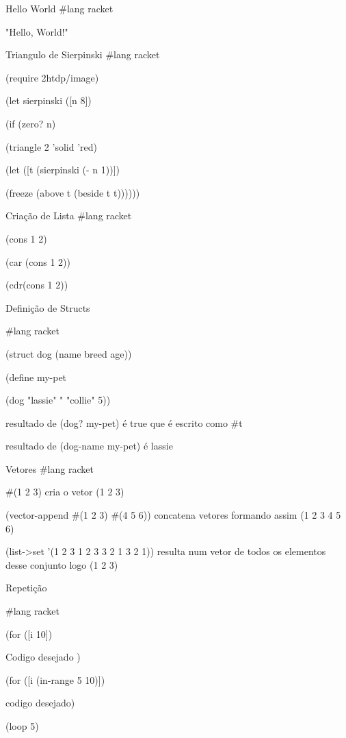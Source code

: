 \documentclass{beamer}
\begin{document}
\begin{frame}{Hello World}
\#lang racket

"Hello, World!"
\end{frame}


\begin{frame}{Triangulo de Sierpinski}
\#lang racket

(require 2htdp/image)

(let sierpinski ([n 8])

  (if (zero? n)
  
    (triangle 2 'solid 'red)
    
    (let ([t (sierpinski (- n 1))])
    
      (freeze (above t (beside t t))))))


\end{frame}


\begin{frame}{Criação de Lista}
\#lang racket

(cons 1 2)

(car (cons 1 2))

(cdr(cons 1 2))
        
\end{frame}


\begin{frame}{Definição de Structs}

\#lang racket

(struct dog (name breed age))

(define my-pet

  (dog "lassie" " "collie" 5))
  
resultado de (dog? my-pet) é true que é escrito como \#t

resultado de (dog-name my-pet) é lassie
  

\end{frame}
\begin{frame}{Vetores}
\#lang racket

\#(1 2 3) cria o vetor (1 2 3)

(vector-append \#(1 2 3) \#(4 5 6)) concatena vetores formando assim (1 2 3 4 5 6)

(list-\textgreater set '(1 2 3 1 2 3 3 2 1 3 2 1)) resulta num vetor de todos os elementos desse conjunto logo (1 2 3)


\end{frame}
\begin{frame}{Repetição}

\#lang racket

(for ([i 10])

  Codigo desejado )
  
(for ([i (in-range 5 10)])

  codigo desejado)
    
(loop 5)

\end{frame}
\end{document}
